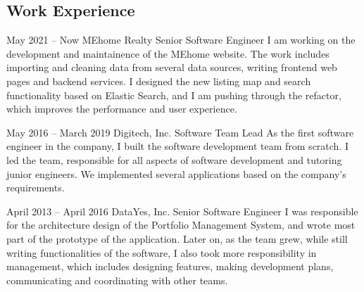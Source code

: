 \documentclass[
	10pt, %
]{FreemanCV}
\begin{document}
\begin{paracol}{2}
\section{Work Experience}





\jobentry
	{May 2021 -- Now} %
	{} %
	{MEhome Realty} %
	{Senior Software Engineer} %
	{I am working on the development and maintainence of the MEhome website. The work includes importing  and cleaning data from several data sources, writing frontend web pages and backend services. I designed the new listing map and search functionality based on Elastic Search, and I am pushing through the refactor, which improves the performance and user experience.} %


\jobentry
	{May 2016 -- March 2019} %
	{} %
	{Digitech, Inc.} %
	{Software Team Lead} %
	{As the first software engineer in the company, I built the software development team from scratch. I led the team, responsible for all aspects of software development and tutoring junior engineers. We implemented several applications based on the company's requirements.} %


\jobentry
	{April 2013 -- April 2016} %
	{} %
	{DataYes, Inc.} %
	{Senior Software Engineer} %
	{I was responsible for the architecture design of the Portfolio Management System, and wrote most part of the prototype of the application. Later on, as the team grew, while still writing functionalities of the software, I also took more responsibility in management, which includes designing features, making development plans, communicating and coordinating with other teams.} %



\end{paracol}
\end{document}
